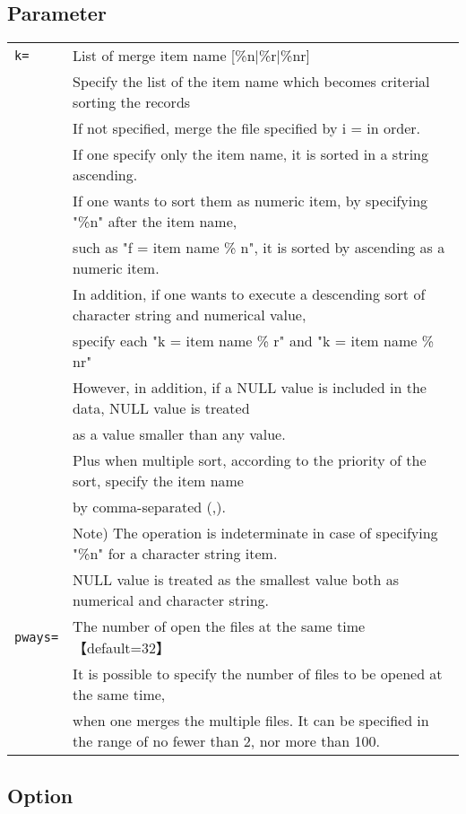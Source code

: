 \documentclass[a4paper]{jarticle}
\begin{document}
\subsection*{Parameter}
\begin{table}[htbp]
{\small
\begin{tabular}{ll}
\verb|k=|    & List of merge item name [\%n$|$\%r$|$\%nr]\\
& Specify the list of the item name which becomes criterial sorting the records\\
& If not specified, merge the file specified by i = in order.\\
& If one specify only the item name, it is sorted in a string ascending.\\
& If one wants to sort them as numeric item, by specifying "\%n" after the item name,\\ 
& such as "f = item name \% n", it is sorted by ascending as a numeric item.\\
& In addition, if one wants to execute a descending sort of character string and numerical value, \\
& specify each "k = item name \% r" and "k = item name \% nr"\\
& However, in addition, if a NULL value is included in the data, NULL value is treated\\ 
& as a value smaller than any value.\\
& Plus when multiple sort, according to the priority of the sort, specify the item name\\ 
& by comma-separated (,).\\
& Note) The operation is indeterminate in case of specifying "\%n" for a character string item. \\
& NULL value is treated as the smallest value both as numerical and character string.\\
\verb|pways=|  & The number of open the files at the same time【default=32】\\
& It is possible to specify the number of files to be opened at the same time, \\
& when one merges the multiple files. It can be specified in the range of no fewer than 2, nor more than 100.\\
\end{tabular} 
}
\end{table} 

\subsection*{Option}
\end{document}
